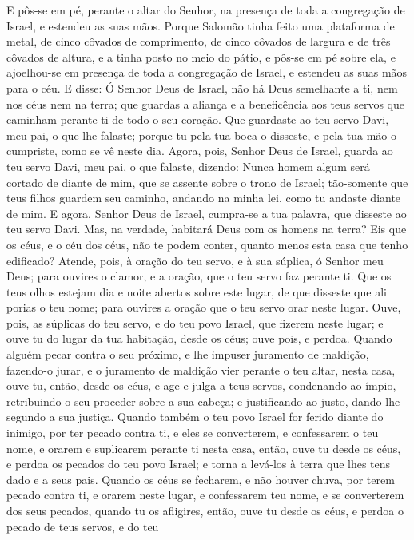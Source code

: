 E pôs-se em pé, perante o altar do Senhor, na presença de toda a
congregação de Israel, e estendeu as suas mãos. Porque
Salomão tinha feito uma plataforma de metal, de cinco côvados de
comprimento, de cinco côvados de largura e de três côvados de
altura, e a tinha posto no meio do pátio, e pôs-se em pé sobre ela,
e ajoelhou-se em presença de toda a congregação de Israel, e
estendeu as suas mãos para o céu. E disse: Ó Senhor Deus de
Israel, não há Deus semelhante a ti, nem nos céus nem na terra; que
guardas a aliança e a beneficência aos teus servos que caminham
perante ti de todo o seu coração. Que guardaste ao teu servo
Davi, meu pai, o que lhe falaste; porque tu pela tua boca o
disseste, e pela tua mão o cumpriste, como se vê neste dia.
Agora, pois, Senhor Deus de Israel, guarda ao teu servo Davi,
meu pai, o que falaste, dizendo: Nunca homem algum será cortado de
diante de mim, que se assente sobre o trono de Israel; tão-somente
que teus filhos guardem seu caminho, andando na minha lei, como tu
andaste diante de mim. E agora, Senhor Deus de Israel,
cumpra-se a tua palavra, que disseste ao teu servo Davi. Mas,
na verdade, habitará Deus com os homens na terra? Eis que os céus, e
o céu dos céus, não te podem conter, quanto menos esta casa que
tenho edificado? Atende, pois, à oração do teu servo, e à sua
súplica, ó Senhor meu Deus; para ouvires o clamor, e a oração, que o
teu servo faz perante ti. Que os teus olhos estejam dia e
noite abertos sobre este lugar, de que disseste que ali porias o teu
nome; para ouvires a oração que o teu servo orar neste lugar.
Ouve, pois, as súplicas do teu servo, e do teu povo Israel,
que fizerem neste lugar; e ouve tu do lugar da tua habitação, desde
os céus; ouve pois, e perdoa. Quando alguém pecar contra o
seu próximo, e lhe impuser juramento de maldição, fazendo-o jurar, e
o juramento de maldição vier perante o teu altar, nesta casa,
ouve tu, então, desde os céus, e age e julga a teus servos,
condenando ao ímpio, retribuindo o seu proceder sobre a sua cabeça;
e justificando ao justo, dando-lhe segundo a sua justiça.
Quando também o teu povo Israel for ferido diante do inimigo,
por ter pecado contra ti, e eles se converterem, e confessarem o teu
nome, e orarem e suplicarem perante ti nesta casa, então,
ouve tu desde os céus, e perdoa os pecados do teu povo Israel; e
torna a levá-los à terra que lhes tens dado e a seus pais.
Quando os céus se fecharem, e não houver chuva, por terem
pecado contra ti, e orarem neste lugar, e confessarem teu nome, e se
converterem dos seus pecados, quando tu os afligires, então,
ouve tu desde os céus, e perdoa o pecado de teus servos, e do teu

